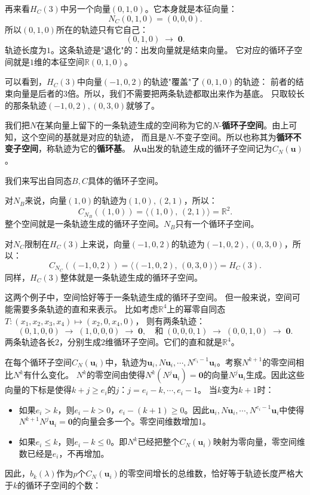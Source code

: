 \documentclass[12pt,UTF8,fontset=none]{ctexbook}
\begin{document}
再来看$H_C(3)$中另一个向量$(0,1,0)$。它本身就是本征向量：
$$
N_C(0,1,0) = (0,0,0).
$$
所以$(0,1,0)$所在的轨迹只有它自己：
$$
(0,1,0) \;\longrightarrow\; \mathbf{0}.
$$
轨迹长度为$1$。这条轨迹是"退化"的：出发向量就是结束向量。
它对应的循环子空间就是$1$维的本征空间$\mathbb{R}(0,1,0)$。

可以看到，$H_C(3)$中向量$(-1,0,2)$的轨迹"覆盖"了$(0,1,0)$的轨迹：
前者的结束向量是后者的$3$倍。所以，我们不需要把两条轨迹都取出来作为基底。
只取较长的那条轨迹$(-1,0,2), (0,3,0)$就够了。

我们把$N$在某向量上留下的一条轨迹生成的空间称为它的$N$-\textbf{循环子空间}。由上可知，这个空间的基就是对应的轨迹，
而且是$N$-不变子空间。所以也称其为\textbf{循环不变子空间}，称轨迹为它的\textbf{循环基}。
从$\mathbf{u}$出发的轨迹生成的循环子空间记为$C_N(\mathbf{u})$。

我们来写出自同态$B,C$具体的循环子空间。

对$N_B$来说，向量$(1,0)$的轨迹为$(1,0), (2,1)$，所以：
$$
C_{N_B}((1,0)) = \langle (1,0),\, (2,1) \rangle = \mathbb{R}^2.
$$
整个空间就是一条轨迹生成的循环子空间。$N_B$只有一个循环子空间。

对$N_C$限制在$H_C(3)$上来说，向量$(-1,0,2)$的轨迹为$(-1,0,2), (0,3,0)$，所以：
$$
C_{N_C}((-1,0,2)) = \langle (-1,0,2),\, (0,3,0) \rangle = H_C(3).
$$
同样，$H_C(3)$整体就是一条轨迹生成的循环子空间。

这两个例子中，空间恰好等于一条轨迹生成的循环子空间。
但一般来说，空间可能需要多条轨迹的直和来表示。
比如考虑$\mathbb{R}^4$上的幂零自同态$T: (x_1,x_2,x_3,x_4) \mapsto (x_2, 0, x_4, 0)$，
则有两条轨迹：
$$
(0,1,0,0) \;\longrightarrow\; (1,0,0,0) \;\longrightarrow\; \mathbf{0}, \quad \mbox{和}\; (0,0,0,1) \;\longrightarrow\; (0,0,1,0) \;\longrightarrow\; \mathbf{0}.
$$
两条轨迹各长$2$，分别生成$2$维循环子空间。它们的直和就是$\mathbb{R}^4$。

在每个循环子空间$C_N(\mathbf{u}_i)$中，轨迹为$\mathbf{u}_i, N\mathbf{u}_i, \cdots, N^{e_i - 1}\mathbf{u}_i$。考察$N^{k+1}$的零空间相比$N^k$有什么变化。
$N^k$的零空间由使得$N^k(N^j\mathbf{u}_i)=\mathbf{0}$的向量$N^j\mathbf{u}_i$生成。因此这些向量的下标是使得$k+j\geqslant e_i$的$j$：$j=e_i-k, \cdots, e_i - 1$。
当$k$变为$k+1$时：
\begin{itemize}
\item 如果$e_i > k$，则$e_i-k>0$，$e_i-(k+1)\geqslant 0$。因此$\mathbf{u}_i, N\mathbf{u}_i, \cdots, N^{e_i - 1}\mathbf{u}_i$中使得$N^{k+1}N^j\mathbf{u}_i = \mathbf{0}$的向量会多一个。零空间维数增加$1$。
\item 如果$e_i \leqslant k$，则$e_i - k \leqslant 0$。即$N^k$已经把整个$C_N(\mathbf{u}_i)$映射为零向量，零空间维数已经是$e_i$，不再增加。
\end{itemize}
因此，$b_k(\lambda)$作为$p$个$C_N(\mathbf{u}_i)$的零空间增长的总维数，恰好等于轨迹长度严格大于$k$的循环子空间的个数：
\end{document}
